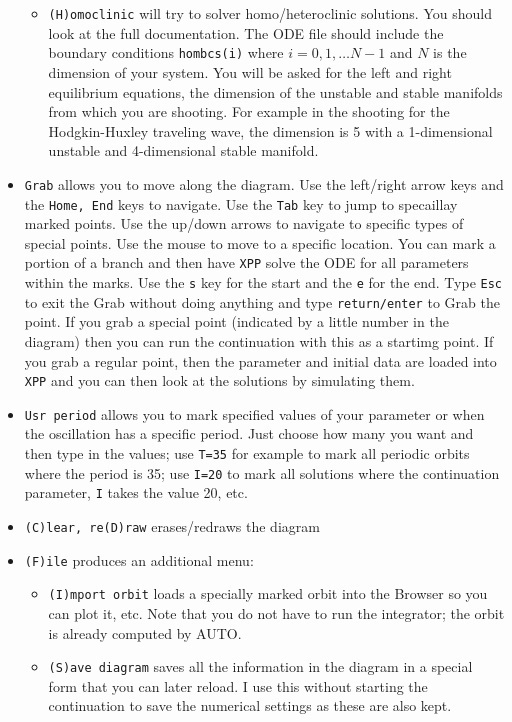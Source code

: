 \documentclass{article}
\begin{document}
\begin{itemize}
\begin{itemize}
\item {\tt (H)omoclinic} will try to solver homo/heteroclinic solutions. You should look at the full documentation. The ODE file should include the boundary conditions {\tt hombcs(i)} where $i=0,1,\ldots N-1$ and $N$ is the dimension of your system. You will be asked for the left and right equilibrium equations, the dimension of the unstable and stable manifolds from which you are shooting. For example in the shooting for the Hodgkin-Huxley traveling wave, the dimension is 5 with a  1-dimensional unstable and 4-dimensional stable manifold. 
\end{itemize} 
\item {\tt Grab} allows you to move along the diagram. Use the left/right arrow keys and the {\tt Home, End} keys to navigate. Use the {\tt Tab} key to jump to specaillay marked points. Use the up/down arrows to navigate to specific types of special points. Use the mouse to move to a specific location. You can mark a portion of a branch and then have {\tt XPP} solve the ODE for all parameters within the marks. Use the {\tt s} key for the start and the {\tt e} for the end. Type {\tt Esc} to exit the Grab without doing anything and type {\tt return/enter} to Grab the point. If you grab a special point (indicated by a little number in the diagram) then you can run the continuation with this as a startimg point. If you grab a regular point, then the parameter and initial data are loaded into {\tt XPP} and you can then look at the solutions by simulating them.
\item {\tt Usr period} allows you to mark specified values of your parameter or when the oscillation has a specific period. Just choose how many you want and then type in the values; use {\tt T=35} for example to mark all periodic orbits where the period is 35; use {\tt I=20} to mark all solutions where the continuation parameter, {\tt I} takes the value 20, etc. 
\item {\tt (C)lear, re(D)raw} erases/redraws the diagram
\item {\tt (F)ile} produces an additional menu:
\begin{itemize}
\item {\tt (I)mport orbit} loads a specially marked orbit into the Browser so you can plot it, etc. Note that you do not have to run the integrator; the orbit is already computed by AUTO.
\item {\tt (S)ave diagram} saves all the information in the diagram in a special form that you can later reload. I use this without starting the continuation to save the numerical settings as these are also kept. 

\end{itemize}
\end{itemize}
\end{document}
